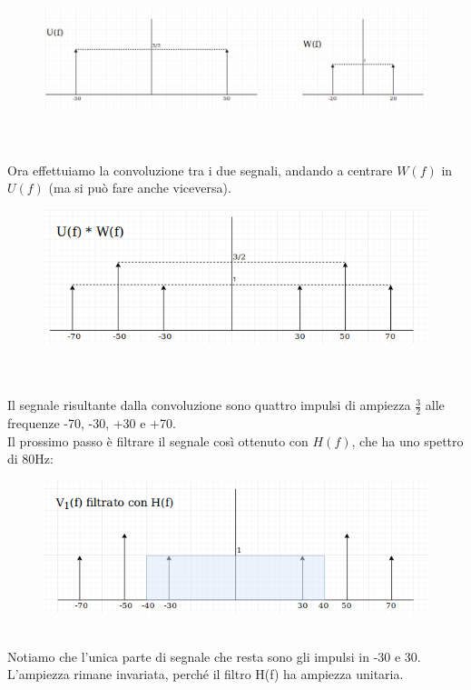 \documentclass[12pt,a4paper]{article}
\begin{document}
	\begin{figure}[h!]
		\centering
		\includegraphics[scale=0.5]{./images/fourier54_2.png}
	\end{figure}
	\\ \\Ora effettuiamo la convoluzione tra i due segnali, andando a centrare $W(f)$ in $U(f)$ (ma si può fare anche viceversa).
	\begin{figure}[h!]
		\centering
		\includegraphics[scale=0.5]{./images/fourier54_3.png}
	\end{figure}
	\\ \\Il segnale risultante dalla convoluzione sono quattro impulsi di ampiezza $\frac{3}{2}$ alle frequenze -70, -30, +30 e +70. \\Il prossimo passo è filtrare il segnale così ottenuto con $H(f)$, che ha uno spettro di 80Hz:
	\begin{figure}[h!]
		\centering
		\includegraphics[scale=0.4]{./images/fourier54_4.png}
	\end{figure}
	\\Notiamo che l'unica parte di segnale che resta sono gli impulsi in -30 e 30. L'ampiezza rimane invariata, perché il filtro H(f) ha ampiezza unitaria.
\end{document}
